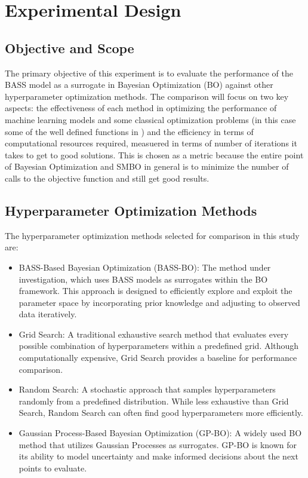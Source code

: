 \section{Experimental Design}

\subsection{Objective and Scope}

The primary objective of this experiment is to evaluate the performance of the BASS model as a surrogate in Bayesian Optimization (BO) against other hyperparameter optimization methods. The comparison will focus on two key aspects: the effectiveness of each method in optimizing the performance of machine learning models and some classical optimization problems (in this case some of the well defined functions in \cite{simulationlib}) and the efficiency in terms of computational resources required, measuered in terms of number of iterations it takes to get to good solutions. This is chosen as a metric because the entire point of Bayesian Optimization and SMBO in general is to minimize the number of calls to the objective function and still get  good results.

\subsection{Hyperparameter Optimization Methods}

The hyperparameter optimization methods selected for comparison in this study are:

\begin{itemize}
	\item BASS-Based Bayesian Optimization (BASS-BO): The method under investigation, which uses BASS models as surrogates within the BO framework. This approach is designed to efficiently explore and exploit the parameter space by incorporating prior knowledge and adjusting to observed data iteratively.
	
	\item Grid Search: A traditional exhaustive search method that evaluates every possible combination of hyperparameters within a predefined grid. Although computationally expensive, Grid Search provides a baseline for performance comparison.
	
	\item Random Search: A stochastic approach that samples hyperparameters randomly from a predefined distribution. While less exhaustive than Grid Search, Random Search can often find good hyperparameters more efficiently.
	
	\item Gaussian Process-Based Bayesian Optimization (GP-BO): A widely used BO method that utilizes Gaussian Processes as surrogates. GP-BO is known for its ability to model uncertainty and make informed decisions about the next points to evaluate.
	
\end{itemize}

